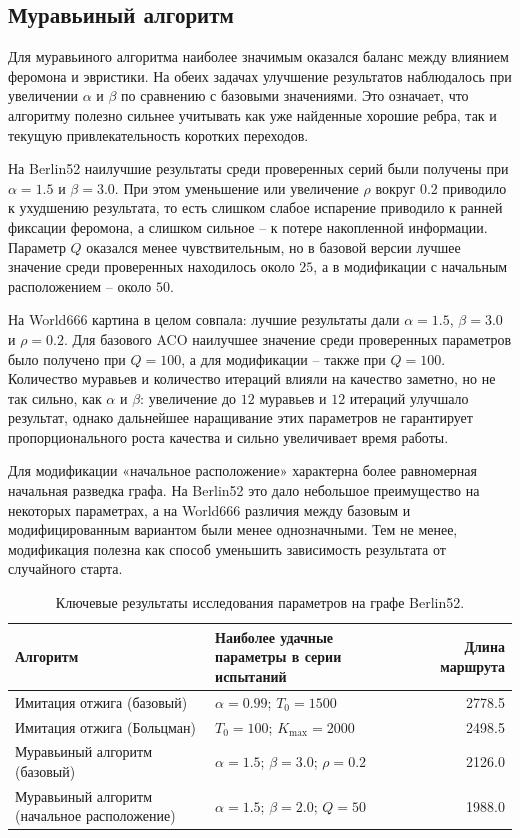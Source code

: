 \documentclass[12pt,a4paper]{article}
\begin{document}
\subsection{Муравьиный алгоритм}

Для муравьиного алгоритма наиболее значимым оказался баланс между влиянием феромона
и эвристики. На обеих задачах улучшение результатов наблюдалось при увеличении
$\alpha$ и $\beta$ по сравнению с базовыми значениями. Это означает, что алгоритму
полезно сильнее учитывать как уже найденные хорошие ребра, так и текущую привлекательность
коротких переходов.

На Berlin52 наилучшие результаты среди проверенных серий были получены при
$\alpha = 1.5$ и $\beta = 3.0$. При этом уменьшение или увеличение $\rho$ вокруг
$0.2$ приводило к ухудшению результата, то есть слишком слабое испарение приводило к
ранней фиксации феромона, а слишком сильное -- к потере накопленной информации.
Параметр $Q$ оказался менее чувствительным, но в базовой версии лучшее значение
среди проверенных находилось около $25$, а в модификации с начальным расположением --
около $50$.

На World666 картина в целом совпала: лучшие результаты дали $\alpha = 1.5$,
$\beta = 3.0$ и $\rho = 0.2$. Для базового ACO наилучшее значение среди проверенных
параметров было получено при $Q = 100$, а для модификации -- также при $Q = 100$.
Количество муравьев и количество итераций влияли на качество заметно, но не так сильно,
как $\alpha$ и $\beta$: увеличение до $12$ муравьев и $12$ итераций улучшало результат,
однако дальнейшее наращивание этих параметров не гарантирует пропорционального роста
качества и сильно увеличивает время работы.

Для модификации «начальное расположение» характерна более равномерная начальная
разведка графа. На Berlin52 это дало небольшое преимущество на некоторых параметрах,
а на World666 различия между базовым и модифицированным вариантом были менее
однозначными. Тем не менее, модификация полезна как способ уменьшить зависимость
результата от случайного старта.

\begin{table}[H]
    \centering
    \caption{Ключевые результаты исследования параметров на графе Berlin52.}
    \begin{tabularx}{\textwidth}{p{3.6cm}Xr}
        \toprule
        Алгоритм & Наиболее удачные параметры в серии испытаний & Длина маршрута \\
        \midrule
        Имитация отжига (базовый) & $\alpha = 0.99$; $T_0 = 1500$ & 2778.5 \\
        Имитация отжига (Больцман) & $T_0 = 100$; $K_{\max} = 2000$ & 2498.5 \\
        Муравьиный алгоритм (базовый) & $\alpha = 1.5$; $\beta = 3.0$; $\rho = 0.2$ & 2126.0 \\
        Муравьиный алгоритм (начальное расположение) & $\alpha = 1.5$; $\beta = 2.0$; $Q = 50$ & 1988.0 \\
        \bottomrule
    \end{tabularx}
\end{table}
\end{document}
